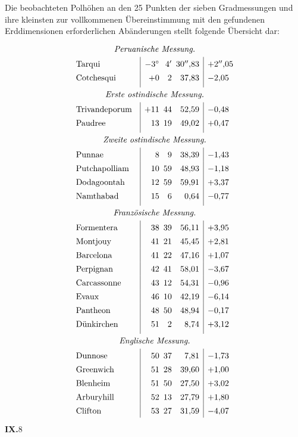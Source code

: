 Die beobachteten Polhöhen an den 25 Punkten der sieben Gradmessungen
und ihre kleinsten zur vollkommenen Übereinstimmung mit den gefundenen
Erddimensionen erforderlichen Abänderungen stellt folgende Übersicht dar:
\[
\renewcommand{\arraystretch}{1.38}
\begin{array}{@{}l@{\quad}|r@{\enspace}r@{\enspace}r|l@{}}
\multicolumn{5}{c}{\textit{Peruanische Messung.}}\\[.3ex]
\text{Tarqui}&-3^\circ&4'&30''{,}83&+2''{,}05\\
\text{Cotchesqui}&+0&2&37{,}83&-2{,}05\\[.8ex]
\multicolumn{5}{c}{\textit{Erste ostindische Messung.}}\\[.3ex]
\text{Trivandeporum}&+11&44&52{,}59&-0{,}48\\
\text{Paudree}&13&19&49{,}02&+0{,}47\\[.8ex]
\multicolumn{5}{c}{\textit{Zweite ostindische Messung.}}\\[.3ex]
\text{Punnae}&8&9&38{,}39&-1{,}43\\
\text{Putchapolliam}&10&59&48{,}93&-1{,}18\\
\text{Dodagoontah}&12&59&59{,}91&+3{,}37\\
\text{Namthabad}&15&6&0{,}64&-0{,}77\\[.8ex]
\multicolumn{5}{c}{\textit{Französische Messung.}}\\[.3ex]
\text{Formentera}&38&39&56{,}11&+3{,}95\\
\text{Montjouy}&41&21&45{,}45&+2{,}81\\
\text{Barcelona}&41&22&47{,}16&+1{,}07\\
\text{Perpignan}&42&41&58{,}01&-3{,}67\\
\text{Carcassonne}&43&12&54{,}31&-0{,}96\\
\text{Evaux}&46&10&42{,}19&-6{,}14\\
\text{Pantheon}&48&50&48{,}94&-0{,}17\\
\text{Dünkirchen}&51&2&8{,}74&+3{,}12\\[.8ex]
\multicolumn{5}{c}{\textit{Englische Messung.}}\\[.3ex]
\text{Dunnose}&50&37&7{,}81&-1{,}73\\
\text{Greenwich}&51&28&39{,}60&+1{,}00\\
\text{Blenheim}&51&50&27{,}50&+3{,}02\\
\text{Arburyhill}&52&13&27{,}79&+1{,}80\\
\text{Clifton}&53&27&31{,}59&-4{,}07
\end{array}
\]
\noindent\textbf{IX.}\hfill 8\hspace{.12\textwidth}\par

